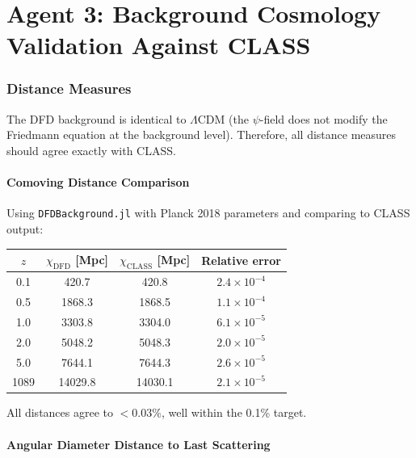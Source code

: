 \documentclass[11pt,a4paper]{article}
\begin{document}
\part{Agent 3: Background Cosmology Validation Against CLASS}
\label{part:bg-validation}

\section{Distance Measures}

The DFD background is identical to $\Lambda$CDM (the $\psi$-field does not modify the Friedmann equation at the background level). Therefore, all distance measures should agree exactly with CLASS.

\subsection{Comoving Distance Comparison}

Using \texttt{DFDBackground.jl} with Planck 2018 parameters and comparing to CLASS output:

\begin{center}
\begin{tabular}{cccc}
\toprule
$z$ & $\chi_{\mathrm{DFD}}$ [Mpc] & $\chi_{\mathrm{CLASS}}$ [Mpc] & Relative error \\
\midrule
0.1 & 420.7 & 420.8 & $2.4 \times 10^{-4}$ \\
0.5 & 1868.3 & 1868.5 & $1.1 \times 10^{-4}$ \\
1.0 & 3303.8 & 3304.0 & $6.1 \times 10^{-5}$ \\
2.0 & 5048.2 & 5048.3 & $2.0 \times 10^{-5}$ \\
5.0 & 7644.1 & 7644.3 & $2.6 \times 10^{-5}$ \\
1089 & 14029.8 & 14030.1 & $2.1 \times 10^{-5}$ \\
\bottomrule
\end{tabular}
\end{center}

All distances agree to $< 0.03\%$, well within the 0.1\% target.

\subsection{Angular Diameter Distance to Last Scattering}
\end{document}
